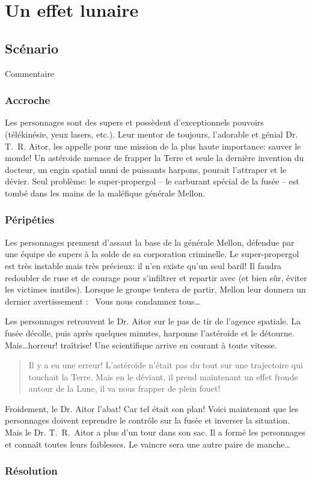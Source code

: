 \chapter{Un effet lunaire}

\section{Scénario}

Commentaire

\subsection{Accroche}

Les personnages sont des supers et possèdent d'exceptionnels pouvoirs (télékinésie, yeux lasers, etc.).
Leur mentor de toujours, l'adorable et génial Dr. T. R. Aitor, les appelle pour une mission de la plus haute importance: sauver le monde!
Un astéroide menace de frapper la Terre et seule la dernière invention du docteur, un engin spatial muni de puissants harpons, pourait l'attraper et le dévier.
Seul problème: le super-propergol -- le carburant spécial de la fusée -- est tombé dans les mains de la maléfique générale Mellon.

\subsection{Péripéties}

Les personnages prennent d'assaut la base de la générale Mellon, défendue par une équipe de supers à la solde de sa corporation criminelle.
Le super-propergol est très instable mais très précieux: il n'en existe qu'un seul baril!
Il faudra redoubler de ruse et de courage pour s'infiltrer et repartir avec (et bien sûr, éviter les victimes inutiles).
Lorsque le groupe tentera de partir, Mellon leur donnera un dernier avertissement : \og Vous nous condamnez tous\dots \fg

Les personnages retrouvent le Dr. Aitor sur le pas de tir de l'agence spatiale.
La fusée décolle, puis après quelques minutes, harponne l'astéroïde et le détourne.
Mais\dots horreur! traîtrise!
Une scientifique arrive en courant à toute vitesse.
\blockquote{Il y a eu une erreur! L'astéroïde n'était pas du tout sur une trajectoire qui touchait la Terre. Mais en le déviant, il prend maintenant un effet fronde autour de la Lune, il va nous frapper de plein fouet!}
Froidement, le Dr. Aitor l'abat! Car tel était son plan!
Voici maintenant que les personnages doivent reprendre le contrôle sur la fusée et inverser la situation.
Mais le Dr. T. R. Aitor a plus d'un tour dans son sac.
Il a formé les personnages et connaît toutes leurs faiblesses.
Le vaincre sera une autre paire de manche\dots

\subsection{Résolution}



